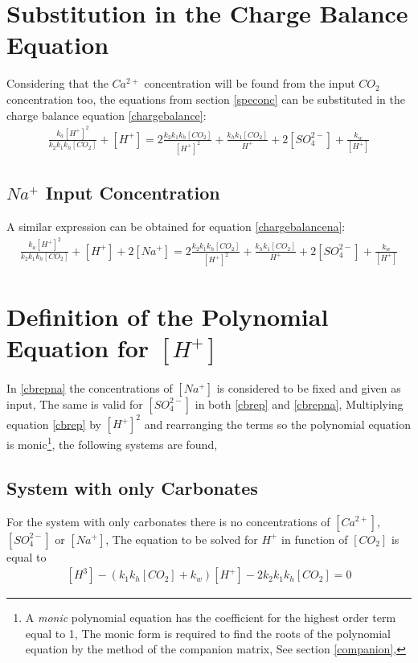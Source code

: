 \documentclass[11pt,a4paper,twoside]{report}
\begin{document}
\section{Substitution in the Charge Balance Equation}
Considering that the $Ca^{2+}$ concentration will be found from the input $CO_{2}$ concentration too, the equations from section \eqref{speconc} can be substituted in the charge balance equation \eqref{chargebalance}:
\begin{align}\label{cbrep}
\frac{k_{a}[H^{+}]^{2}}{k_{2}k_{1}k_{h}[CO_{2}]} + [H^{+}] = 2\frac{k_{2}k_{1}k_{h}[CO_{2}]}{[H^{+}]^{2}} + \frac{k_{h}k_{1}[CO_{2}]}{H^{+}} + 2[SO_{4}^{2-}] + \frac{k_{w}}{[H^{+}]}
\end{align}

\subsection{\texorpdfstring{$Na^{+}$}{Na} Input Concentration}
A similar expression can be obtained for equation \eqref{chargebalancena}:
\begin{align}\label{cbrepna}
\frac{k_{a}[H^{+}]^{2}}{k_{2}k_{1}k_{h}[CO_{2}]} + [H^{+}] +2[Na^{+}]= 2\frac{k_{2}k_{1}k_{h}[CO_{2}]}{[H^{+}]^{2}} + \frac{k_{h}k_{1}[CO_{2}]}{H^{+}} + 2[SO_{4}^{2-}] + \frac{k_{w}}{[H^{+}]}
\end{align}

\section{Definition of the Polynomial Equation for \texorpdfstring{$[H^{+}]$}{H}}
In \eqref{cbrepna} the concentrations of $[Na^{+}]$ is considered to be fixed and given as input, The same is valid for $[SO_{4}^{2-}]$ in both \eqref{cbrep} and \eqref{cbrepna}, Multiplying equation \eqref{cbrep} by $[H^{+}]^{2}$ and rearranging the terms so the polynomial equation is monic\footnote{A \textit{monic} polynomial equation has the coefficient for the highest order term equal to 1, The monic form is required to find the roots of the polynomial equation by the method of the companion matrix, See section \eqref{companion},}, the following systems are found,

\subsection{System with only Carbonates}
For the system with only carbonates there is no concentrations of $[Ca^{2+}]$, $[SO_{4}^{2-}]$ or $[Na^{+}]$, The equation to be solved for $H^{+}$ in function of $[CO_{2}]$ is equal to 
\begin{align}\label{hco}
[H^{3}] - \left(k_{1}k_{h}[CO_{2}] + k_{w} \right)[H^{+}] - 2k_{2}k_{1}k_{h}[CO_{2}] = 0
\end{align}
\end{document}
